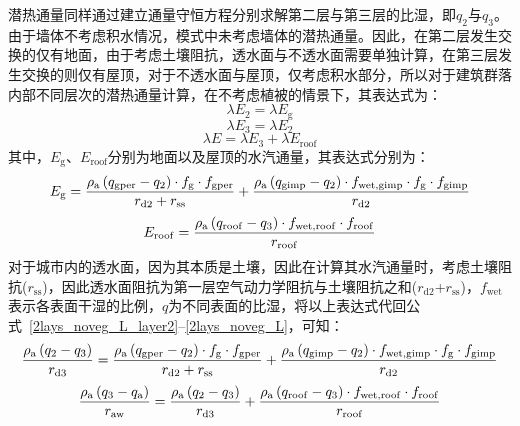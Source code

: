 潜热通量同样通过建立通量守恒方程分别求解第二层与第三层的比湿，即$q_2$与$q_3$。由于墙体不考虑积水情况，模式中未考虑墙体的潜热通量。因此，在第二层发生交换的仅有地面，由于考虑土壤阻抗，透水面与不透水面需要单独计算，在第三层发生交换的则仅有屋顶，对于不透水面与屋顶，仅考虑积水部分，所以对于建筑群落内部不同层次的潜热通量计算，在不考虑植被的情景下，其表达式为：
\begin{equation}\label{2lays_noveg_L_layer2}
  \lambda E_{\mathrm{2}} = \lambda E_{\mathrm{g}}
\end{equation}
%
\begin{equation}
  \lambda E_{3} = \lambda E_{2}
\end{equation}
%
\begin{equation}\label{2lays_noveg_L}
  \lambda E = \lambda E_{3} + \lambda E_{\mathrm{roof}}
\end{equation}
其中，$ E_{\mathrm{g}}$、$ E_{\mathrm{roof}}$分别为地面以及屋顶的水汽通量，其表达式分别为：
\begin{equation}\label{urban_noveg_Eg}
  E_{\mathrm{g}} = \frac{\rho _{\rm a} \left( q_{\mathrm{gper}}-q_{2} \right) \cdot f_{\mathrm{g}} \cdot f_{\mathrm{gper}}}{r_{\mathrm{d2}}+r_{\mathrm{ss}}} + \frac{\rho _{\rm a} \left( q_{\mathrm{gimp}}-q_{2} \right) \cdot f_{\mathrm{wet,gimp}} \cdot f_{\mathrm{g}} \cdot f_{\mathrm{gimp}}}{r_{\mathrm{d2}}}
\end{equation}
%
\begin{equation}\label{urban_noveg_Eroof}
  E_{\mathrm{roof}} = \frac{\rho _{\rm a} \left( q_{\mathrm{roof}}-q_{3}\right) \cdot f_{\mathrm{wet,roof}} \cdot f_{\mathrm{roof}}}{r_{\mathrm{roof}}}
\end{equation}
对于城市内的透水面，因为其本质是土壤，因此在计算其水汽通量时，考虑土壤阻抗($r_{\mathrm{ss}}$)，因此透水面阻抗为第一层空气动力学阻抗与土壤阻抗之和($r_{\mathrm{d2}}$+$r_{\mathrm{ss}}$)，$f_{\mathrm{wet}}$表示各表面干湿的比例，$q$为不同表面的比湿，将以上表达式代回公式~\eqref{2lays_noveg_L_layer2}--\eqref{2lays_noveg_L}，可知：
\begin{equation}
  \frac{\rho _{\rm a} \left( q_{2}-q_{3}\right)}{r_{\mathrm{d3}}} =
  \frac{\rho _{\rm a} \left( q_{\mathrm{gper}}-q_{2}\right) \cdot f_{\mathrm{g}} \cdot f_{\mathrm{gper}}}{r_{\mathrm{d2}}+r_{\mathrm{ss}}} + \frac{\rho _{\rm a} \left( q_{\mathrm{gimp}}-q_{\mathrm{2}} \right) \cdot f_{\mathrm{wet,gimp}} \cdot f_{\mathrm{g}} \cdot f_{\mathrm{gimp}}}{r_{\mathrm{d2}}}
\end{equation}
%
\begin{equation}
  \frac{\rho _{\rm a} \left( q_{3} - q_{\rm a}\right)}{r_{\mathrm{aw}}} = \frac{\rho _{\rm a} \left( q_{2} - q_{3}\right)}{r_{\mathrm{d3}}} + \frac{\rho _{\rm a} \left( q_{\mathrm{roof}}-q_{3}\right) \cdot f_{\mathrm{wet,roof}} \cdot f_{\mathrm{roof}}}{r_{\mathrm{roof}}}
\end{equation}
